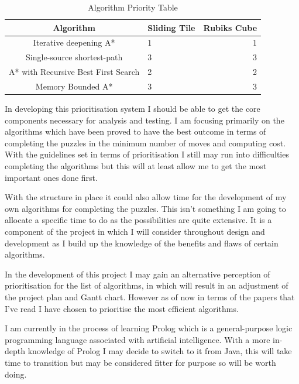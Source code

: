 \documentclass[proposal]{cmpreport}
\begin{document}
\begin{table}[ht]
	\caption{Algorithm Priority Table}
	\begin{center}
		\begin{tabular}{clr} \hline
			Algorithm & Sliding Tile & Rubiks Cube \\ \hline
			Iterative deepening A*  & 1 & 1 \\
			Single-source shortest-path & 3 & 3 \\ 
			A* with Recursive Best First Search & 2 & 2 \\ 
			Memory Bounded A* & 3 & 3 \\ \hline
		\end{tabular}
	\end{center}
\end{table}

In developing this prioritisation system I should be able to get the core components necessary for analysis and testing. I am focusing primarily on the algorithms which have been proved to have the best outcome in terms of completing the puzzles in the minimum number of moves and computing cost. With the guidelines set in terms of prioritisation I still may run into difficulties completing the algorithms but this will at least allow me to get the most important ones done first.

With the structure in place it could also allow time for the development of my own algorithms for completing the puzzles. This isn't something I am going to allocate a specific time to do as the possibilities are quite extensive. It is a component of the project in which I will consider throughout design and development as I build up the knowledge of the benefits and flaws of certain algorithms.

In the development of this project I may gain an alternative perception of prioritisation for the list of algorithms, in which will result in an adjustment of the project plan and Gantt chart. However as of now in terms of the papers that I've read I have chosen to prioritise the most efficient algorithms.     

I am currently in the process of learning Prolog which is a general-purpose logic programming language associated with artificial intelligence. With a more in-depth knowledge of Prolog I may decide to switch to it from Java, this will take time to transition but may be considered fitter for purpose so will be worth doing. 
\end{document}
